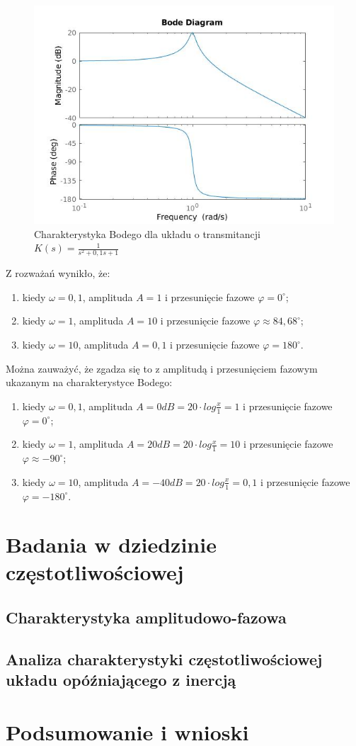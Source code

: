\documentclass[12pt]{article}
\begin{document}
\begin{figure}[H]
    \centering
    \includegraphics[width=\textwidth]{bode.jpg}
    \caption{Charakterystyka Bodego dla układu o transmitancji $K(s) = \frac{1}{s^2+0,1s+1}$}
\end{figure}

Z rozważań wynikło, że:
\begin{enumerate}
    \item kiedy $\omega = 0,1$, amplituda $A=1$ i przesunięcie fazowe $\varphi = 0 ^\circ$;
    \item kiedy $\omega = 1$, amplituda $A=10$ i przesunięcie fazowe $\varphi \approx 84,68 ^\circ$;
    \item kiedy $\omega = 10$, amplituda $A=0,1$ i przesunięcie fazowe $\varphi = 180 ^\circ$.
\end{enumerate}
Można zauważyć, że zgadza się to z amplitudą i przesunięciem fazowym ukazanym na charakterystyce Bodego:
\begin{enumerate}
    \item kiedy $\omega = 0,1$, amplituda $A=0 dB = 20\cdot log \frac{x}{1} = 1$ i przesunięcie fazowe $\varphi = 0 ^\circ$;
    \item kiedy $\omega = 1$, amplituda $A=20dB = 20\cdot log \frac{x}{1} = 10$ i przesunięcie fazowe $\varphi \approx -90^\circ$;
    \item kiedy $\omega = 10$, amplituda $A=-40 dB = 20\cdot log \frac{x}{1} = 0,1$ i przesunięcie fazowe $\varphi = -180 ^\circ$.
\end{enumerate}


\section{Badania w dziedzinie częstotliwościowej}
\subsection{Charakterystyka amplitudowo-fazowa}
\subsection{Analiza charakterystyki częstotliwościowej układu opóźniającego z inercją}

\section{Podsumowanie i wnioski}
\end{document}
